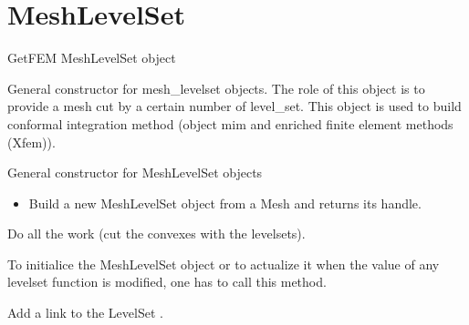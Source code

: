 \documentclass[a4paper,11pt,english]{sphinxmanual}
\begin{document}
\section{MeshLevelSet}
\label{\detokenize{python/cmdref_MeshLevelSet:meshlevelset}}\label{\detokenize{python/cmdref_MeshLevelSet::doc}}

\begin{fulllineitems}
\label{\detokenize{python/cmdref_MeshLevelSet:getfem.MeshLevelSet}}
GetFEM MeshLevelSet object

General constructor for mesh\_levelset objects. The role of this object is
to provide a mesh cut by a certain number of level\_set. This object is
used to build conformal integration method (object mim and enriched finite
element methods (Xfem)).

General constructor for MeshLevelSet objects
\begin{itemize}
\item {} 
Build a new MeshLevelSet object from a Mesh and returns its handle.

\end{itemize}

\begin{fulllineitems}
\label{\detokenize{python/cmdref_MeshLevelSet:getfem.MeshLevelSet.adapt}}
Do all the work (cut the convexes with the levelsets).

To initialice the MeshLevelSet object or to actualize it when the
value of any levelset function is modified, one has to call
this method.

\end{fulllineitems}


\begin{fulllineitems}
\label{\detokenize{python/cmdref_MeshLevelSet:getfem.MeshLevelSet.add}}
Add a link to the LevelSet .


\end{fulllineitems}
\end{fulllineitems}
\end{document}
